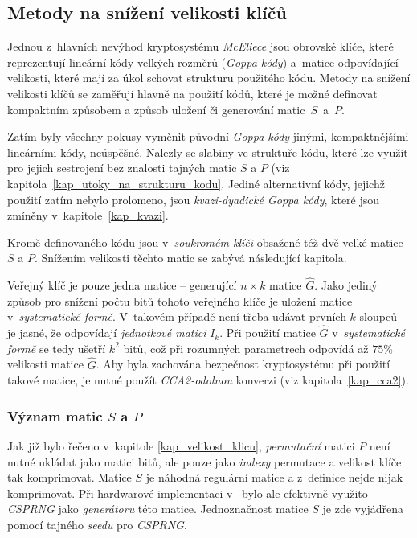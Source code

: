 \documentclass[thesis=M,czech,hidelinks]{FITthesis}[2012/06/26]
\newcommand{\0}{{\textcolor[gray]{0.80}{0}}}
\begin{document}
\subsection{Metody na snížení velikosti klíčů}\label{kap_snizeni_velikosti_klicu}

Jednou z~hlavních nevýhod kryptosystému \emph{McEliece} jsou obrovské klíče,
které reprezentují lineární kódy velkých rozměrů (\emph{Goppa kódy}) a~matice
odpovídající velikosti, které mají za úkol schovat strukturu použitého kódu.
Metody na snížení velikosti klíčů se zaměřují hlavně na použití kódů, které je
možné definovat kompaktním způsobem a způsob uložení či generování
matic~$S$~a~$P$.

Zatím byly všechny pokusy vyměnit původní \emph{Goppa kódy} jinými,
kompaktnějšími lineárními kódy, neúspěšné. Nalezly se slabiny ve struktuře kódu,
které lze využít pro jejich sestrojení bez znalosti tajných matic $S$ a $P$ (viz
kapitola~\ref{kap_utoky_na_strukturu_kodu}. Jediné alternativní kódy, jejichž
použití zatím nebylo prolomeno, jsou \emph{kvazi-dyadické Goppa kódy}, které
jsou zmíněny v~kapitole~\ref{kap_kvazi}.

Kromě definovaného kódu jsou v~\emph{soukromém klíči} obsažené též dvě velké
matice $S$ a $P$. Snížením velikosti těchto matic se zabývá následující
kapitola.

Veřejný klíč je pouze jedna matice --  generující $n \times k$
matice $\hat{G}$. Jako jediný způsob pro snížení počtu bitů tohoto veřejného
klíče je uložení matice v~\emph{systematické formě}. V~takovém případě není
třeba udávat prvních $k$ sloupců -- je jasné, že odpovídají \emph{jednotkové
matici} $I_k$. Při použití matice $\hat{G}$ v~\emph{systematické formě} se tedy
ušetří $k^2$ bitů, což při rozumných parametrech odpovídá až $75 $\;\% velikosti
matice $\hat{G}$. Aby byla zachována bezpečnost kryptosystému při použití takové
matice, je nutné použít \emph{CCA2-odolnou} konverzi (viz
kapitola~\ref{kap_cca2}).

\subsubsection{Význam matic $S$ a $P$}

Jak již bylo řečeno v~kapitole \ref{kap_velikost_klicu}, \emph{permutační}
matici $P$ není nutné ukládat jako matici bitů, ale pouze jako \emph{indexy}
permutace a velikost klíče tak komprimovat. Matice $S$ je náhodná regulární
matice a z~definice nejde nijak komprimovat. Při hardwarové implementaci
v~\cite{Paustjan} bylo ale efektivně využito \emph{CSPRNG} jako
\emph{generátoru} této matice. Jednoznačnost matice $S$ je zde vyjádřena pomocí
tajného \emph{seedu} pro \emph{CSPRNG}.
\end{document}
